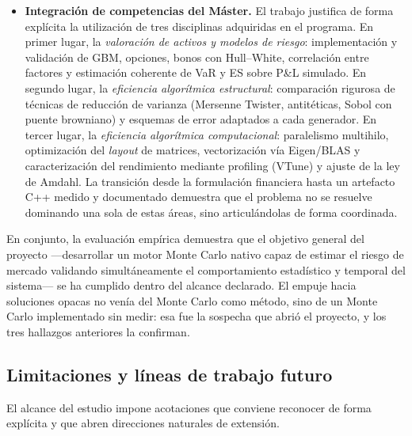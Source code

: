 \documentclass[11pt]{article}
\begin{document}
\begin{itemize}
    \item \textbf{Integración de competencias del Máster.}
    El trabajo justifica de forma explícita la utilización de tres disciplinas adquiridas en el programa.
    En primer lugar, la \emph{valoración de activos y modelos de riesgo}: implementación y validación de GBM, opciones, bonos con Hull--White, correlación entre factores y estimación coherente de VaR y ES sobre P\&L simulado.
    En segundo lugar, la \emph{eficiencia algorítmica estructural}: comparación rigurosa de técnicas de reducción de varianza (Mersenne Twister, antitéticas, Sobol con puente browniano) y esquemas de error adaptados a cada generador.
    En tercer lugar, la \emph{eficiencia algorítmica computacional}: paralelismo multihilo, optimización del \emph{layout} de matrices, vectorización vía Eigen/BLAS y caracterización del rendimiento mediante profiling (VTune) y ajuste de la ley de Amdahl.
    La transición desde la formulación financiera hasta un artefacto C++ medido y documentado demuestra que el problema no se resuelve dominando una sola de estas áreas, sino articulándolas de forma coordinada.
\end{itemize}

En conjunto, la evaluación empírica demuestra que el objetivo general del proyecto ---desarrollar un motor Monte Carlo nativo capaz de estimar el riesgo de mercado validando simultáneamente el comportamiento estadístico y temporal del sistema--- se ha cumplido dentro del alcance declarado.
El empuje hacia soluciones opacas no venía del Monte Carlo como método, sino de un Monte Carlo implementado sin medir: esa fue la sospecha que abrió el proyecto, y los tres hallazgos anteriores la confirman.

\subsection{Limitaciones y líneas de trabajo futuro}

El alcance del estudio impone acotaciones que conviene reconocer de forma explícita y que abren direcciones naturales de extensión.
\end{document}
